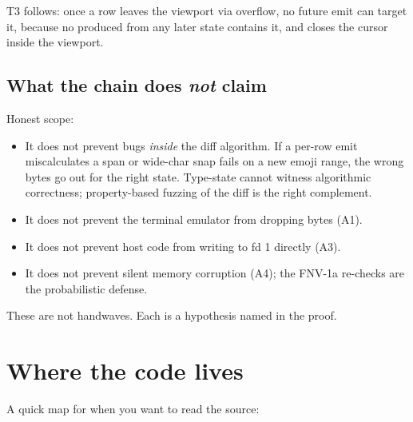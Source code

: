 T3 follows: once a row leaves the viewport via overflow, no future
emit can target it, because no  produced from any
later state contains it, and  closes the cursor
inside the viewport.

\subsection{What the chain does \emph{not} claim}

Honest scope:

\begin{itemize}[leftmargin=*]
  \item It does not prevent bugs \emph{inside} the diff algorithm.
    If a per-row emit miscalculates a span or wide-char snap fails
    on a new emoji range, the wrong bytes go out for the right
    state. Type-state cannot witness algorithmic correctness;
    property-based fuzzing of the diff is the right complement.
  \item It does not prevent the terminal emulator from dropping
    bytes (A1).
  \item It does not prevent host code from writing to fd 1 directly
    (A3).
  \item It does not prevent silent memory corruption (A4); the
    FNV-1a re-checks are the probabilistic defense.
\end{itemize}

These are not handwaves. Each is a hypothesis named in the proof.

\section{Where the code lives}

A quick map for when you want to read the source:

